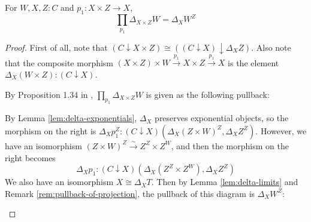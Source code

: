 \begin{lemma}\label{lem:constant-dependent-product}
  For $ W, X, Z : C $ and $ p_1 : X \times Z \to X $,
  \[ \prod_{p_1} \Delta_{X \times Z} W = \Delta_X W^Z \]
\end{lemma}
\begin{proof}
  First of all, note that $ (C \downarrow X \times Z) \cong ((C \downarrow X) \downarrow \Delta_X Z) $. Also note that the composite morphism $ (X \times Z) \times W \xrightarrow{p_1} X \times Z \xrightarrow{p_1} X $ is the element $ \Delta_X (W \times Z) : (C \downarrow X) $.

  By Proposition 1.34 in \cite{freyd}, $ \prod_{p_1} \Delta_{X \times Z} W $ is given as the following pullback:
  \begin{center}
  \end{center}

  By Lemma \ref{lem:delta-exponentials}, $ \Delta_X $ preserves exponential objects, so the morphism on the right is $ \Delta_X p_1^Z : (C \downarrow X)(\Delta_X (Z \times W)^Z, \Delta_X Z^Z) $. However, we have an isomorphism $ (Z \times W)^Z \xrightarrow \sim Z^Z \times Z^W $, and then the morphism on the right becomes
  \[ \Delta_X p_1 : (C \downarrow X)(\Delta_X(Z^Z \times Z^W), \Delta_X Z^Z) \]
  We also have an isomorphism $ X \cong \Delta_X T $. Then by Lemma \ref{lem:delta-limits} and Remark \ref{rem:pullback-of-projection}, the pullback of this diagram is $ \Delta_X W^Z $:
  \begin{center}
  \end{center}
\end{proof}

